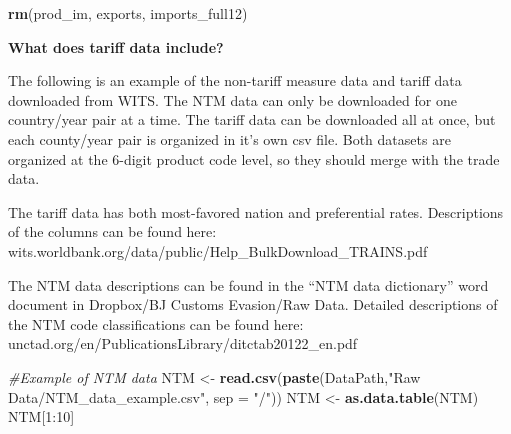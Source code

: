 \documentclass[10pt,]{article}
\newenvironment{Shaded}{\begin{snugshade}}{\end{snugshade}}
\newcommand{\KeywordTok}[1]{\textcolor[rgb]{0.13,0.29,0.53}{\textbf{{#1}}}}
\newcommand{\DataTypeTok}[1]{\textcolor[rgb]{0.13,0.29,0.53}{{#1}}}
\newcommand{\DecValTok}[1]{\textcolor[rgb]{0.00,0.00,0.81}{{#1}}}
\newcommand{\StringTok}[1]{\textcolor[rgb]{0.31,0.60,0.02}{{#1}}}
\newcommand{\CommentTok}[1]{\textcolor[rgb]{0.56,0.35,0.01}{\textit{{#1}}}}
\newcommand{\NormalTok}[1]{{#1}}
\begin{document}
\begin{Shaded}
\begin{Highlighting}[]
\KeywordTok{rm}\NormalTok{(prod_im, exports, imports_full12)}
\end{Highlighting}
\end{Shaded}

\textbf{What does tariff data include?}

The following is an example of the non-tariff measure data and tariff
data downloaded from WITS. The NTM data can only be downloaded for one
country/year pair at a time. The tariff data can be downloaded all at
once, but each county/year pair is organized in it's own csv file. Both
datasets are organized at the 6-digit product code level, so they should
merge with the trade data.

The tariff data has both most-favored nation and preferential rates.
Descriptions of the columns can be found here:
wits.worldbank.org/data/public/Help\_BulkDownload\_TRAINS.pdf

The NTM data descriptions can be found in the ``NTM data dictionary''
word document in Dropbox/BJ Customs Evasion/Raw Data. Detailed
descriptions of the NTM code classifications can be found here:
unctad.org/en/PublicationsLibrary/ditctab20122\_en.pdf

\begin{Shaded}
\begin{Highlighting}[]
\CommentTok{#Example of NTM data}
\NormalTok{NTM <-}\StringTok{ }\KeywordTok{read.csv}\NormalTok{(}\KeywordTok{paste}\NormalTok{(DataPath,}\StringTok{"Raw Data/NTM_data_example.csv"}\NormalTok{, }\DataTypeTok{sep =} \StringTok{"/"}\NormalTok{))}
\NormalTok{NTM <-}\StringTok{ }\KeywordTok{as.data.table}\NormalTok{(NTM)}
\NormalTok{NTM[}\DecValTok{1}\NormalTok{:}\DecValTok{10}\NormalTok{]}
\end{Highlighting}
\end{Shaded}
\end{document}

